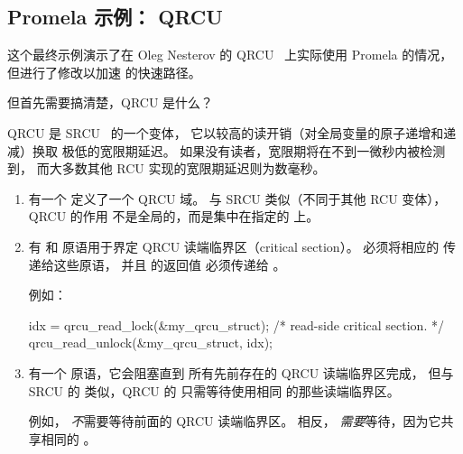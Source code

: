 
\subsection{Promela 示例：
			     QRCU}
\label{sec:formal:Promela Example: QRCU}

这个最终示例演示了在 Oleg Nesterov 的
QRCU~\cite{OlegNesterov2006QRCU,OlegNesterov2006aQRCU}
上实际使用 Promela 的情况，
但进行了修改以加速  的快速路径。

但首先需要搞清楚，QRCU 是什么？

QRCU 是 SRCU~\cite{PaulEMcKenney2006c} 的一个变体，
它以较高的读开销（对全局变量的原子递增和递减）换取
极低的宽限期延迟。
如果没有读者，宽限期将在不到一微秒内被检测到，
而大多数其他 RCU 实现的宽限期延迟则为数毫秒。

\begin{enumerate}
\item	有一个  定义了一个 QRCU 域。
	与 SRCU 类似（不同于其他 RCU 变体），QRCU 的作用
	不是全局的，而是集中在指定的  上。
\item	有  和 
	原语用于界定 QRCU 读端临界区（critical section）。
	必须将相应的  传递给这些原语，
	并且  的返回值
	必须传递给 。

	例如：

\begin{VerbatimU}
idx = qrcu_read_lock(&my_qrcu_struct);
/* read-side critical section. */
qrcu_read_unlock(&my_qrcu_struct, idx);
\end{VerbatimU}

\item	有一个  原语，它会阻塞直到
	所有先前存在的 QRCU 读端临界区完成，
	但与 SRCU 的  类似，QRCU 的
	 只需等待使用相同 
	的那些读端临界区。

	例如，
	\emph{不}需要等待前面的 QRCU 读端临界区。
	相反，
	\emph{需要}等待，因为它共享相同的 。
\end{enumerate}

